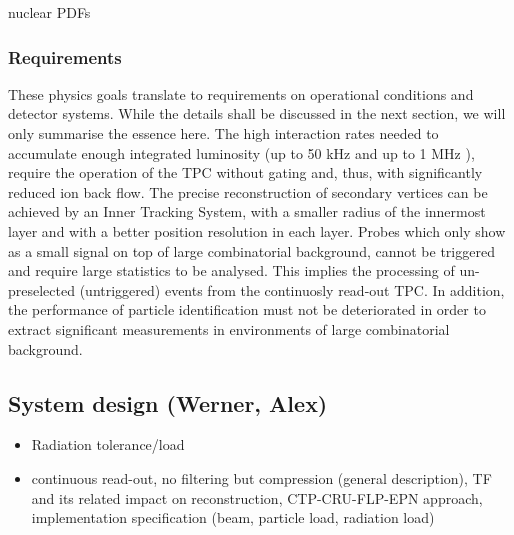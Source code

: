 nuclear PDFs

\subsubsection{Requirements}
\label{sec:physics_motivation}

These physics goals translate to requirements on operational conditions and detector systems. While the details shall be discussed in the next section, we will only summarise the essence here. The high interaction rates needed to accumulate enough integrated luminosity (up to 50 kHz \PbPb{} and up to 1 MHz \pp{}), require the operation of the TPC without gating and, thus, with significantly reduced ion back flow. The precise reconstruction of secondary vertices can be achieved by an Inner Tracking System, with a smaller radius of the innermost layer and with a better position resolution in each layer. Probes which only show as a small signal on top of large combinatorial background, cannot be triggered and require large statistics to be analysed. This implies the processing of un-preselected (untriggered) events from the continuosly read-out TPC. In addition, the performance of particle identification must not be deteriorated in order to extract significant measurements in environments of large combinatorial background.

\subsection{System design (Werner, Alex)}
\begin{itemize}
\item Radiation tolerance/load
\item continuous read-out, no filtering but compression (general description), TF and its related impact on reconstruction, CTP-CRU-FLP-EPN approach, implementation specification (beam, particle load, radiation load)
\end{itemize}
